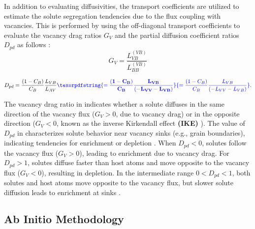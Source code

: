 \documentclass[preprint,12pt]{elsarticle}
\providecommand{\DIFaddtex}[1]{{\bf #1}} %
\providecommand{\DIFdeltex}[1]{} %
\providecommand{\DIFaddbegin}{\protect\color{blue}} %
\providecommand{\DIFaddend}{\protect\color{black}} %
\providecommand{\DIFdelbegin}{\protect\color{red}} %
\providecommand{\DIFdelend}{\protect\color{black}} %
\providecommand{\DIFadd}[1]{\texorpdfstring{\DIFaddtex{#1}}{#1}} %
\providecommand{\DIFdel}[1]{\texorpdfstring{\DIFdeltex{#1}}{}} %
\newcommand{\DIFscaledelfig}{0.5}
\newlength{\DIFdelgraphicswidth} %
\newlength{\DIFdelgraphicsheight} %
\newcommand{\DIFaddincludegraphics}[2][]{{\color{blue}\fbox{\DIFOincludegraphics[#1]{#2}}}} %
\newcommand{\DIFdelincludegraphics}[2][]{%
\sbox{\DIFdelgraphicsbox}{\DIFOincludegraphics[#1]{#2}}%
\settoboxwidth{\DIFdelgraphicswidth}{\DIFdelgraphicsbox} %
\settoboxtotalheight{\DIFdelgraphicsheight}{\DIFdelgraphicsbox} %
\scalebox{\DIFscaledelfig}{%
\parbox[b]{\DIFdelgraphicswidth}{\usebox{\DIFdelgraphicsbox}\\[-\baselineskip] \rule{\DIFdelgraphicswidth}{0em}}\llap{\resizebox{\DIFdelgraphicswidth}{\DIFdelgraphicsheight}{%
\setlength{\unitlength}{\DIFdelgraphicswidth}%
\begin{picture}(1,1)%
\thicklines\linethickness{2pt} %
{\color[rgb]{1,0,0}\put(0,0){\framebox(1,1){}}}%
{\color[rgb]{1,0,0}\put(0,0){\line( 1,1){1}}}%
{\color[rgb]{1,0,0}\put(0,1){\line(1,-1){1}}}%
\end{picture}%
}\hspace*{3pt}}} %
} %
\DeclareRobustCommand{\DIFaddbegin}{\DIFOaddbegin \let\includegraphics\DIFaddincludegraphics} %
\DeclareRobustCommand{\DIFaddend}{\DIFOaddend \let\includegraphics\DIFOincludegraphics} %
\DeclareRobustCommand{\DIFdelbegin}{\DIFOdelbegin \let\includegraphics\DIFdelincludegraphics} %
\DeclareRobustCommand{\DIFdelend}{\DIFOaddend \let\includegraphics\DIFOincludegraphics} %
\begin{document}
In addition to evaluating diffusivities, the transport coefficients are utilized to estimate the solute segregation tendencies due to the flux coupling with vacancies. This is performed by using the off-diagonal transport coefficients to evaluate the vacancy drag ratios $G_V$ and the partial diffusion coefficient ratios $D_{pd}$ as follows \cite{messina_exact_2014, messina_solute_2020}:
\begin{equation}
\label{eq:drag}
    G_V = \frac{L_{VB}^{(VB)}}{L_{BB}^{(VB)}}
\end{equation}

\begin{equation}
\label{eq:pdc}
D_{pd} = \frac{(1-C_B)}{C_B} \frac{L_{VB}}{L_{AV}} \DIFaddbegin \DIFadd{= \frac{(1-C_B)}{C_B} \frac{L_{VB}}{(-L_{VV}-L_{VB})}}\DIFaddend .
\end{equation}

\noindent The vacancy drag ratio in  indicates whether a solute diffuses in the same direction of the vacancy flux  ($G_V > 0$, due to vacancy drag) or in the opposite direction ($G_V < 0$, known as the inverse Kirkendall effect \DIFdelbegin \DIFdel{, IKE}\DIFdelend \DIFaddbegin \DIFadd{(IKE) }\DIFaddend \citep{marwick_segregation_1978}). The value of \( D_{pd} \) in  characterizes solute behavior near vacancy sinks (e.g., grain boundaries), indicating tendencies for enrichment or depletion \citep{messina_exact_2014}. When \( D_{pd} < 0 \), solutes follow the vacancy flux (\( G_V > 0 \)), leading to enrichment due to vacancy drag. For \( D_{pd} > 1 \), solutes diffuse faster than host atoms and move opposite to the vacancy flux (\( G_V < 0 \)), resulting in depletion. In the intermediate range \( 0 < D_{pd} < 1 \), both solutes and host atoms move opposite to the vacancy flux, but slower solute diffusion leads to enrichment at sinks \cite{messina_exact_2014}.

\FloatBarrier
\subsection{Ab Initio Methodology}
\end{document}
